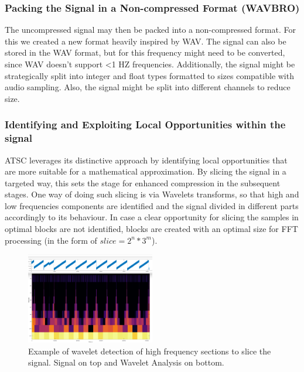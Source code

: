 \documentclass[conference]{IEEEtran}
\begin{document}
\vspace{10pt}
\subsubsection{Packing the Signal in a Non-compressed Format (WAVBRO)}
The uncompressed signal may then be packed into a non-compressed format. For this we created a new format heavily inspired by WAV. The signal can also be stored in the WAV format, but for this frequency might need to be converted, since WAV doesn't support <1 HZ frequencies. Additionally, the signal might be strategically split into integer and float types formatted to sizes compatible with audio sampling. Also, the signal might be split into different channels to reduce size. 

\vspace{10pt}
\subsubsection{Identifying and Exploiting Local Opportunities within the signal}
ATSC leverages its distinctive approach by identifying local opportunities that are more suitable for a mathematical approximation. By slicing the signal in a targeted way, this sets the stage for enhanced compression in the subsequent stages. One way of doing such slicing is via Wavelets transforms, so that high and low frequencies components are identified and the signal divided in different parts accordingly to its behaviour.
In case a clear opportunity for slicing the samples in optimal blocks are not identified, blocks are created with an optimal size for FFT processing (in the form of $slice = 2^n * 3^m$).

\begin{figure}[ht]
  \centering
  \includegraphics[width=0.5\textwidth]{wavelet_heap.png}
  \caption{Example of wavelet detection of high frequency sections to slice the signal. Signal on top and Wavelet Analysis on bottom.}
  \label{Fig.3}
\end{figure}
\vspace{5pt}
\end{document}
